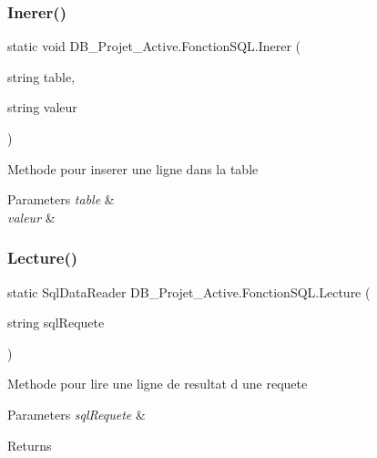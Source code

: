 \subsubsection{\texorpdfstring{Inerer()}{Inerer()}}
{\footnotesize\ttfamily static void D\+B\+\_\+\+Projet\+\_\+\+Active.\+Fonction\+S\+Q\+L.\+Inerer (\begin{DoxyParamCaption}\item[{string}]{table,  }\item[{string}]{valeur }\end{DoxyParamCaption})\hspace{0.3cm}{\ttfamily [static]}}



Methode pour inserer une ligne dans la table 


\begin{DoxyParams}{Parameters}
{\em table} & \\
\hline
{\em valeur} & \\
\hline
\end{DoxyParams}
\mbox{\label{class_d_b___projet___active_1_1_fonction_s_q_l_a932d9adcf7a102f4580dec18dd3f6966}} 
\subsubsection{\texorpdfstring{Lecture()}{Lecture()}}
{\footnotesize\ttfamily static Sql\+Data\+Reader D\+B\+\_\+\+Projet\+\_\+\+Active.\+Fonction\+S\+Q\+L.\+Lecture (\begin{DoxyParamCaption}\item[{string}]{sql\+Requete }\end{DoxyParamCaption})\hspace{0.3cm}{\ttfamily [static]}}



Methode pour lire une ligne de resultat d une requete 


\begin{DoxyParams}{Parameters}
{\em sql\+Requete} & \\
\hline
\end{DoxyParams}
\begin{DoxyReturn}{Returns}

\end{DoxyReturn}
\mbox{\label{class_d_b___projet___active_1_1_fonction_s_q_l_a4a6c50c6ff240b9c017e84099aa58f93}} 
